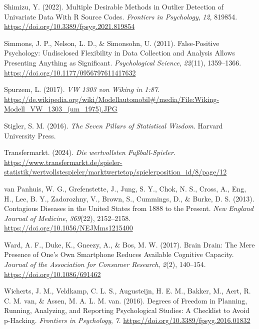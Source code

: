 \documentclass[
  letterpaper,
  twoside,
  open=any]{scrbook}
\newlength{\cslhangindent}
\newenvironment{CSLReferences}[2] %
 {\begin{list}{}{%
  \setlength{\itemindent}{0pt}
  \setlength{\leftmargin}{0pt}
  \setlength{\parsep}{0pt}
  \ifodd #1
   \setlength{\leftmargin}{\cslhangindent}
   \setlength{\itemindent}{-1\cslhangindent}
  \fi
  \setlength{\itemsep}{#2\baselineskip}}}
 {\end{list}}
\theoremstyle{definition}
\theoremstyle{definition}
\theoremstyle{definition}
\theoremstyle{remark}
\begin{document}
\begin{CSLReferences}{1}{0}
Shimizu, Y. (2022). Multiple {Desirable Methods} in {Outlier Detection}
of {Univariate Data With R Source Codes}. \emph{Frontiers in
Psychology}, \emph{12}, 819854.
\url{https://doi.org/10.3389/fpsyg.2021.819854}

Simmons, J. P., Nelson, L. D., \& Simonsohn, U. (2011). False-{Positive
Psychology}: {Undisclosed Flexibility} in {Data Collection} and
{Analysis Allows Presenting Anything} as {Significant}.
\emph{Psychological Science}, \emph{22}(11), 1359--1366.
\url{https://doi.org/10.1177/0956797611417632}

Spurzem, L. (2017). \emph{{VW} 1303 von {Wiking} in 1:87}.
\url{https://de.wikipedia.org/wiki/Modellautomobil\#/media/File:Wiking-Modell_VW_1303_(um_1975).JPG}

Stigler, S. M. (2016). \emph{The Seven Pillars of Statistical Wisdom}.
Harvard University Press.

Transfermarkt. (2024). \emph{Die wertvollsten Fußball-Spieler}.
\url{https://www.transfermarkt.de/spieler-statistik/wertvollstespieler/marktwertetop/spielerposition_id/8/page/12}

van Panhuis, W. G., Grefenstette, J., Jung, S. Y., Chok, N. S., Cross,
A., Eng, H., Lee, B. Y., Zadorozhny, V., Brown, S., Cummings, D., \&
Burke, D. S. (2013). Contagious {Diseases} in the {United States} from
1888 to the {Present}. \emph{New England Journal of Medicine},
\emph{369}(22), 2152--2158. \url{https://doi.org/10.1056/NEJMms1215400}

Ward, A. F., Duke, K., Gneezy, A., \& Bos, M. W. (2017). Brain {Drain}:
{The Mere Presence} of {One}'s {Own Smartphone Reduces Available
Cognitive Capacity}. \emph{Journal of the Association for Consumer
Research}, \emph{2}(2), 140--154. \url{https://doi.org/10.1086/691462}

Wicherts, J. M., Veldkamp, C. L. S., Augusteijn, H. E. M., Bakker, M.,
Aert, R. C. M. van, \& Assen, M. A. L. M. van. (2016). Degrees of
{Freedom} in {Planning}, {Running}, {Analyzing}, and {Reporting
Psychological Studies}: {A Checklist} to {Avoid} p-{Hacking}.
\emph{Frontiers in Psychology}, \emph{7}.
\url{https://doi.org/10.3389/fpsyg.2016.01832}


\end{CSLReferences}
\end{document}
